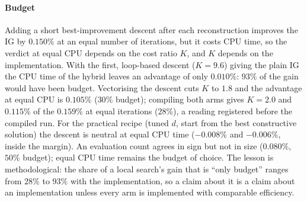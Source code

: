 \paragraph{Budget} Adding a short best-improvement descent after each reconstruction improves the IG by $0.150\%$ at an equal number of iterations, but it costs CPU time, so the verdict at equal CPU depends on the cost ratio $K$, and $K$ depends on the implementation. With the first, loop-based descent ($K=9.6$) giving the plain IG the CPU time of the hybrid leaves an advantage of only $0.010\%$: $93\%$ of the gain would have been budget. Vectorising the descent cuts $K$ to $1.8$ and the advantage at equal CPU is $0.105\%$ ($30\%$ budget); compiling both arms gives $K=2.0$ and $0.115\%$ of the $0.159\%$ at equal iterations ($28\%$), a reading registered before the compiled run. For the practical recipe (tuned $d$, start from the best constructive solution) the descent is neutral at equal CPU time ($-0.008\%$ and $-0.006\%$, inside the margin). An evaluation count agrees in sign but not in size ($0.080\%$, $50\%$ budget); equal CPU time remains the budget of choice. The lesson is methodological: the share of a local search's gain that is ``only budget'' ranges from $28\%$ to $93\%$ with the implementation, so a claim about it is a claim about an implementation unless every arm is implemented with comparable efficiency.

